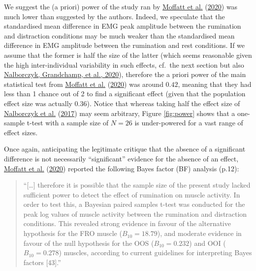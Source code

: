 \documentclass[
  english,
  man, donotrepeattitle,floatsintext]{apa6}
\begin{document}
We suggest the (a priori) power of the study ran by \protect\hyperlink{ref-moffatt_inner_2020}{Moffatt et al.} (\protect\hyperlink{ref-moffatt_inner_2020}{2020}) was much lower than suggested by the authors. Indeed, we speculate that the standardised mean difference in EMG peak amplitude between the rumination and distraction conditions may be much weaker than the standardised mean difference in EMG amplitude between the rumination and rest conditions. If we assume that the former is half the size of the latter (which seems reasonable given the high inter-individual variability in such effects, cf.~the next section but also \protect\hyperlink{ref-nalborczyk_can_2020}{Nalborczyk, Grandchamp, et al., 2020}), therefore the a priori power of the main statistical test from \protect\hyperlink{ref-moffatt_inner_2020}{Moffatt et al.} (\protect\hyperlink{ref-moffatt_inner_2020}{2020}) was around \(0.42\), meaning that they had less than 1 chance out of 2 to find a significant effect (given that the population effect size was actually \(0.36\)). Notice that whereas taking half the effect size of \protect\hyperlink{ref-nalborczyk_orofacial_2017}{Nalborczyk et al.} (\protect\hyperlink{ref-nalborczyk_orofacial_2017}{2017}) may seem arbitrary, Figure \ref{fig:power} shows that a one-sample t-test with a sample size of \(N = 26\) is under-powered for a vast range of effect sizes.

Once again, anticipating the legitimate critique that the absence of a significant difference is not necessarily ``significant'' evidence for the absence of an effect, \protect\hyperlink{ref-moffatt_inner_2020}{Moffatt et al.} (\protect\hyperlink{ref-moffatt_inner_2020}{2020}) reported the following Bayes factor (BF) analysis (p.12):

\begin{quote}
``{[}\ldots{]} therefore it is possible that the sample size of the present study lacked sufficient power to detect the effect of rumination on muscle activity. In order to test this, a Bayesian paired samples t-test was conducted for the peak log values of muscle activity between the rumination and distraction conditions. This revealed strong evidence in favour of the alternative hypothesis for the FRO muscle (\(B_{10} = 18.79\)), and moderate evidence in favour of the null hypothesis for the OOS (\(B_{10} = 0.232\)) and OOI (\(B_{10} = 0.278\)) muscles, according to current guidelines for interpreting Bayes factors {[}43{]}.''
\end{quote}
\end{document}
